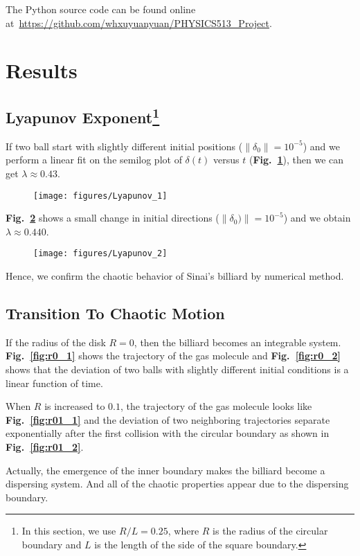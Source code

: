 \documentclass[12pt]{article}
\begin{document}
The Python source code can be found online at~\url{https://github.com/whxuyuanyuan/PHYSICS513_Project}.

\section*{Results}
\subsection*{Lyapunov Exponent\footnote{In this section, we use $R / L = 0.25$, where $R$ is the radius of the circular boundary and $L$ is the length of the side of the square boundary.}}
If two ball start with slightly different initial positions ($\| \delta_0 \| = 10^{-5}$) and we perform a linear fit on the semilog plot of $\delta(t)$ versus $t$ ({\bf Fig.~\ref{fig:ly1}}), then we can get $\lambda \approx 0.43$.
\begin{figure}[H]
	\centering
	\texttt{[image: figures/Lyapunov\_1]}
	\caption{}
	\label{fig:ly1}
\end{figure}
{\bf Fig.~\ref{fig:ly2}} shows a small change in initial directions ($\| \delta_0) \| = 10^{-5}$) and we obtain $\lambda \approx 0.440$.  
\begin{figure}[H]
	\centering
	\texttt{[image: figures/Lyapunov\_2]}
	\caption{}
	\label{fig:ly2}
\end{figure}

Hence, we confirm the chaotic behavior of Sinai's billiard by numerical method.

\subsection*{Transition To Chaotic Motion}
If the radius of the disk $R = 0$, then the billiard becomes an integrable system. {\bf Fig.~\ref{fig:r0_1}} shows the trajectory of the gas molecule and {\bf Fig.~\ref{fig:r0_2}} shows that the deviation of two balls with slightly different initial conditions is a linear function of time.

When $R$ is increased to $0.1$, the trajectory of the gas molecule looks like {\bf Fig.~\ref{fig:r01_1}} and the deviation of two neighboring trajectories separate exponentially after the first collision with the circular boundary as shown in {\bf Fig.~\ref{fig:r01_2}}.

Actually, the emergence of the inner boundary makes the billiard become a dispersing system. And all of the chaotic properties appear due to the dispersing boundary. 
\end{document}
